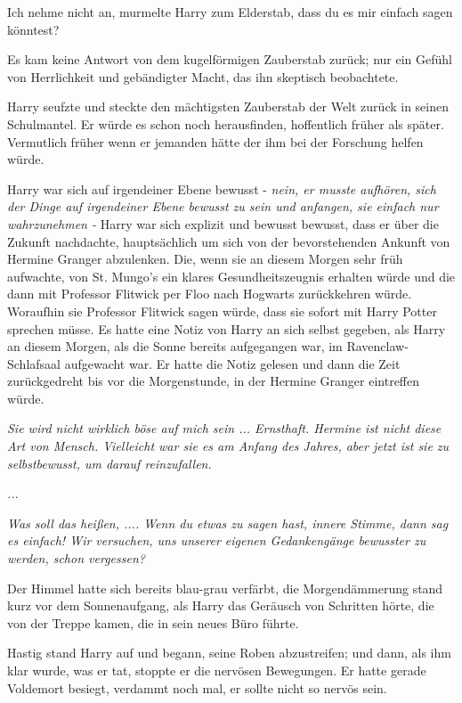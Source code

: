 \glqq{}Ich nehme nicht an\grqq{}, murmelte Harry zum Elderstab, \glqq{}dass du es
mir einfach sagen könntest?\grqq{}

Es kam keine Antwort von dem kugelförmigen Zauberstab zurück; nur ein Gefühl von
Herrlichkeit und gebändigter Macht, das ihn skeptisch beobachtete.

Harry seufzte und steckte den mächtigsten Zauberstab der Welt zurück in seinen
Schulmantel. Er würde es schon noch herausfinden, hoffentlich früher als später.
Vermutlich früher wenn er jemanden hätte der ihm bei der Forschung helfen würde.

Harry war sich auf irgendeiner Ebene bewusst -\emph{ nein, er musste aufhören,
sich der Dinge auf irgendeiner Ebene bewusst zu sein und anfangen, sie einfach
nur wahrzunehmen -} Harry war sich explizit und bewusst bewusst, dass er über
die Zukunft nachdachte, hauptsächlich um sich von der bevorstehenden Ankunft von
Hermine Granger abzulenken. Die, wenn sie an diesem Morgen sehr früh aufwachte,
von St. Mungo's ein klares Gesundheitszeugnis erhalten würde und die dann mit
Professor Flitwick per Floo nach Hogwarts zurückkehren würde. Woraufhin sie
Professor Flitwick sagen würde, dass sie sofort mit Harry Potter sprechen müsse.
Es hatte eine Notiz von Harry an sich selbst gegeben, als Harry an diesem
Morgen, als die Sonne bereits aufgegangen war, im Ravenclaw-Schlafsaal
aufgewacht war. Er hatte die Notiz gelesen und dann die Zeit zurückgedreht bis
vor die Morgenstunde, in der Hermine Granger eintreffen würde.

\emph{Sie wird nicht wirklich böse auf mich sein ... Ernsthaft. Hermine ist
nicht diese Art von Mensch. Vielleicht war sie es am Anfang des Jahres, aber
jetzt ist sie zu selbstbewusst, um darauf reinzufallen.}

\emph{...}

\emph{Was soll das heißen, \glqq{}...\grqq{}. Wenn du etwas zu sagen hast, innere
Stimme, dann sag es einfach! Wir versuchen, uns unserer eigenen Gedankengänge
bewusster zu werden, schon vergessen?}

Der Himmel hatte sich bereits blau-grau verfärbt, die Morgendämmerung stand kurz
vor dem Sonnenaufgang, als Harry das Geräusch von Schritten hörte, die von der
Treppe kamen, die in sein neues Büro führte.

Hastig stand Harry auf und begann, seine Roben abzustreifen; und dann, als ihm
klar wurde, was er tat, stoppte er die nervösen Bewegungen. Er hatte gerade
Voldemort besiegt, verdammt noch mal, er sollte nicht so nervös sein.

